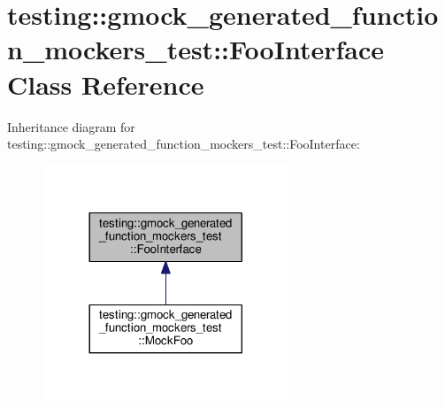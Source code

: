 \hypertarget{classtesting_1_1gmock__generated__function__mockers__test_1_1FooInterface}{}\section{testing\+:\+:gmock\+\_\+generated\+\_\+function\+\_\+mockers\+\_\+test\+:\+:Foo\+Interface Class Reference}
\label{classtesting_1_1gmock__generated__function__mockers__test_1_1FooInterface}


Inheritance diagram for testing\+:\+:gmock\+\_\+generated\+\_\+function\+\_\+mockers\+\_\+test\+:\+:Foo\+Interface\+:
\nopagebreak
\begin{figure}[H]
\begin{center}
\leavevmode
\includegraphics[width=209pt]{classtesting_1_1gmock__generated__function__mockers__test_1_1FooInterface__inherit__graph}
\end{center}
\end{figure}
